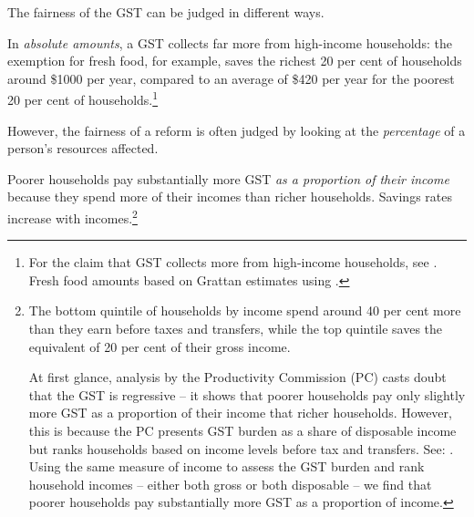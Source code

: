 The fairness of the GST can be judged in different ways. 

In \emph{absolute amounts}, a GST collects far more from high-income households:
the exemption for fresh food, for example, saves the richest 20 per cent of households around \$1000 per year, compared to an average of \$420 per year for the poorest 20 per cent of households.\footnote{For the claim that GST collects more from high-income households, see \textcites{OECDKoreaInstitutePublicFinance2014-Distributional-Effects-Consumption-Taxes}{Freebairn2013}{HenryTaxReview2010}. Fresh food amounts based on Grattan estimates using \textcites{Treasury2015TES2014}{ABS2011HES0910curf}.}

However, the fairness of a reform is often judged by looking at the \emph{percentage} of a person’s resources affected.  

Poorer households pay substantially more GST \emph{as a proportion of their income} because they spend more of their incomes than richer households. Savings rates increase with incomes.\footnote{The bottom quintile of households by income spend around 40 per cent more than they earn before taxes and transfers, while the top quintile saves the equivalent of 20 per cent of their gross income. 

At first glance, analysis by the Productivity Commission (PC) casts doubt that the GST is regressive  – it shows that poorer households pay only slightly more GST as a proportion of their income that richer households. However, this is because the PC presents GST burden as a share of disposable income but ranks households based on income levels before tax and transfers. See: \textcite[][74--76]{ProductivityCommission2015-Tax-and-transfer-incidence}.  Using the same measure of income to assess the GST burden and rank household incomes – either both gross or both disposable – we find that poorer households pay substantially more GST as a proportion of income.
}

